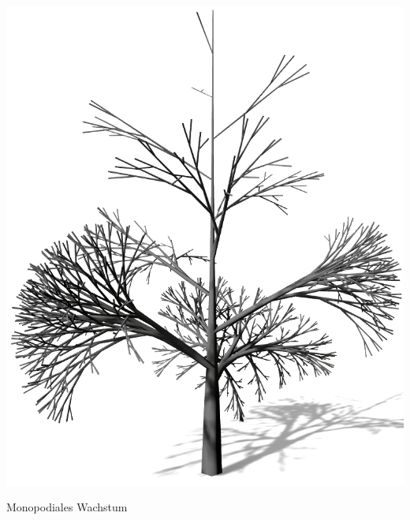 \begin{center}
\begin{minipage}[c]{0.45\textwidth}
		\includegraphics[height=.9\textheight]{images/LS_Monopodial_2}
	\end{minipage}
	\vspace{0.05\textheight}
	
	Monopodiales Wachstum
\end{center}







